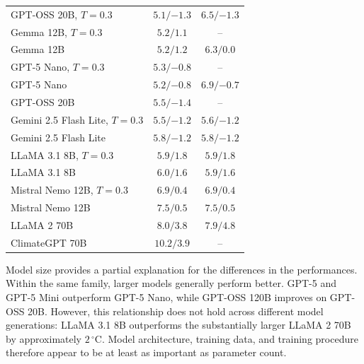 \begin{longtable}{@{}lcc@{}}
    GPT-OSS 20B, \(T=0.3\)
        & \(5.1 / {-1.3}\)
        & \(6.5 / {-1.3}\) \\

    Gemma 12B, \(T=0.3\)
        & \(5.2 / 1.1\)
        & -- \\

    Gemma 12B
        & \(5.2 / 1.2\)
        & \(6.3 / 0.0\) \\

    GPT-5 Nano, \(T=0.3\)
        & \(5.3 / {-0.8}\)
        & -- \\

    GPT-5 Nano
        & \(5.2 / {-0.8}\)
        & \(6.9 / {-0.7}\) \\

    GPT-OSS 20B
        & \(5.5 / {-1.4}\)
        & -- \\

    Gemini 2.5 Flash Lite, \(T=0.3\)
        & \(5.5 / {-1.2}\)
        & \(5.6 / {-1.2}\) \\

    Gemini 2.5 Flash Lite
        & \(5.8 / {-1.2}\)
        & \(5.8 / {-1.2}\) \\

    LLaMA 3.1 8B, \(T=0.3\)
        & \(5.9 / 1.8\)
        & \(5.9 / 1.8\) \\

    LLaMA 3.1 8B
        & \(6.0 / 1.6\)
        & \(5.9 / 1.6\) \\

    Mistral Nemo 12B, \(T=0.3\)
        & \(6.9 / 0.4\)
        & \(6.9 / 0.4\) \\

    Mistral Nemo 12B
        & \(7.5 / 0.5\)
        & \(7.5 / 0.5\) \\

    LLaMA 2 70B
        & \(8.0 / 3.8\)
        & \(7.9 / 4.8\) \\

    ClimateGPT 70B
        & \(10.2 / 3.9\)
        & -- \\

\end{longtable}

Model size provides a partial explanation for the differences in the performances. Within the same family, larger models generally perform better. GPT-5 and GPT-5 Mini outperform GPT-5 Nano, while GPT-OSS 120B improves on GPT-OSS 20B. However, this relationship does not hold across different model generations: LLaMA 3.1 8B outperforms the substantially larger LLaMA 2 70B by approximately \(2\,^{\circ}\mathrm{C}\). Model architecture, training data, and training procedure therefore appear to be at least as important as parameter count.


